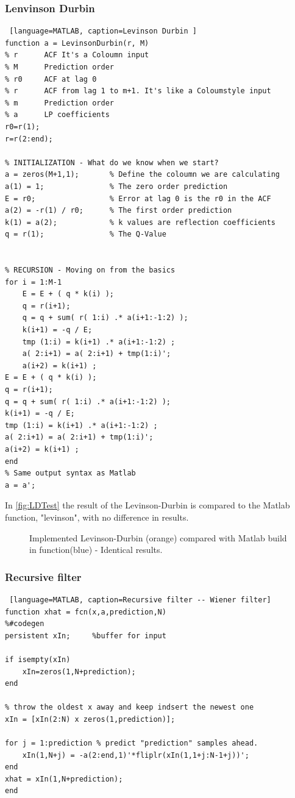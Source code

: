 \subsubsection{Lenvinson Durbin}
\begin{lstlisting} [language=MATLAB, caption=Levinson Durbin ]
function a = LevinsonDurbin(r, M)
% r      ACF It's a Coloumn input
% M      Prediction order
% r0     ACF at lag 0
% r      ACF from lag 1 to m+1. It's like a Coloumstyle input
% m      Prediction order
% a      LP coefficients
r0=r(1);
r=r(2:end);

% INITIALIZATION - What do we know when we start?
a = zeros(M+1,1);       % Define the coloumn we are calculating
a(1) = 1;               % The zero order prediction
E = r0;                 % Error at lag 0 is the r0 in the ACF
a(2) = -r(1) / r0;      % The first order prediction
k(1) = a(2);            % k values are reflection coefficients
q = r(1);               % The Q-Value


% RECURSION - Moving on from the basics
for i = 1:M-1
	E = E + ( q * k(i) );                   
	q = r(i+1);
	q = q + sum( r( 1:i) .* a(i+1:-1:2) );
	k(i+1) = -q / E;
	tmp (1:i) = k(i+1) .* a(i+1:-1:2) ;
	a( 2:i+1) = a( 2:i+1) + tmp(1:i)';
	a(i+2) = k(i+1) ;
E = E + ( q * k(i) );                   
q = r(i+1);
q = q + sum( r( 1:i) .* a(i+1:-1:2) );
k(i+1) = -q / E;
tmp (1:i) = k(i+1) .* a(i+1:-1:2) ;
a( 2:i+1) = a( 2:i+1) + tmp(1:i)';
a(i+2) = k(i+1) ;
end
% Same output syntax as Matlab
a = a';
\end{lstlisting}
In \autoref{fig:LDTest} the result of the Levinson-Durbin is compared to the Matlab function, "levinson", with no difference in results.   
\begin{figure}[H]
	\centering
	
	\caption{Implemented Levinson-Durbin (orange) compared with Matlab build in function(blue) - Identical results.}
	\label{fig:LDTest}
\end{figure}

\subsubsection{Recursive filter}
\begin{lstlisting} [language=MATLAB, caption=Recursive filter -- Wiener filter]
function xhat = fcn(x,a,prediction,N)
%#codegen
persistent xIn;     %buffer for input

if isempty(xIn)
	xIn=zeros(1,N+prediction);
end

% throw the oldest x away and keep indsert the newest one
xIn = [xIn(2:N) x zeros(1,prediction)]; 

for j = 1:prediction % predict "prediction" samples ahead. 
	xIn(1,N+j) = -a(2:end,1)'*fliplr(xIn(1,1+j:N-1+j))';
end
xhat = xIn(1,N+prediction);
end
\end{lstlisting}

